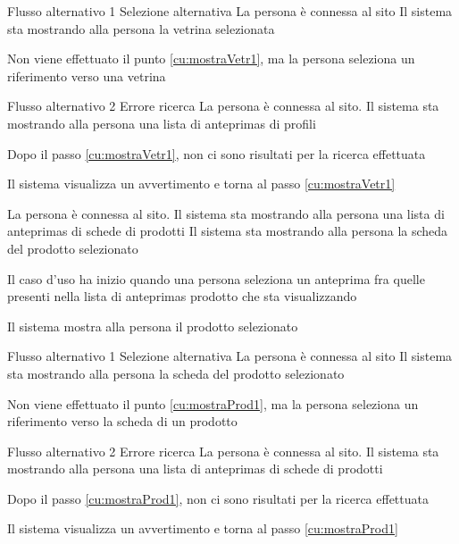 %
%
{Flusso alternativo 1}%
{Selezione alternativa}%
{La persona è connessa al sito}%
{Il sistema sta mostrando alla persona la vetrina selezionata}%
{\begin{enumCU}
	\item Non viene effettuato il punto \ref{cu:mostraVetr1}, ma la persona seleziona un \gls{riferimento} verso una vetrina
\end{enumCU}}%
%
%
{Flusso alternativo 2}%
{Errore ricerca}%
{La persona è connessa al sito. Il sistema sta mostrando alla persona una lista di \glspl{anteprima} di profili}%
{\postNulle}%
{\begin{enumCU}
	\item Dopo il passo \ref{cu:mostraVetr1}, non ci sono risultati per la ricerca effettuata
	\item Il sistema visualizza un avvertimento e torna al passo \ref{cu:mostraVetr1}
\end{enumCU}}%


{La persona è connessa al sito. Il sistema sta mostrando alla persona una lista di \glspl{anteprima} di schede di prodotti}
{Il sistema sta mostrando alla persona la scheda del prodotto selezionato}
{\begin{enumCU}
	\item Il caso d'uso ha inizio quando una persona seleziona un \gls{anteprima} fra quelle presenti nella lista di \glspl{anteprima} prodotto che sta visualizzando\label{cu:mostraProd1}
	\item Il sistema mostra alla persona il prodotto selezionato
	\item {}
\end{enumCU}
}
%
{Flusso alternativo 1}%
{Selezione alternativa}%
{La persona è connessa al sito}%
{Il sistema sta mostrando alla persona la scheda del prodotto selezionato}%
{\begin{enumCU}
		\item Non viene effettuato il punto \ref{cu:mostraProd1}, ma la persona seleziona un \gls{riferimento} verso la scheda di un prodotto
\end{enumCU}}%
%
{Flusso alternativo 2}%
{Errore ricerca}%
{La persona è connessa al sito. Il sistema sta mostrando alla persona una lista di \glspl{anteprima} di schede di prodotti}%
{\postNulle}%
{\begin{enumCU}
		\item Dopo il passo \ref{cu:mostraProd1}, non ci sono risultati per la ricerca effettuata
		\item Il sistema visualizza un avvertimento e torna al passo \ref{cu:mostraProd1}
\end{enumCU}}%

